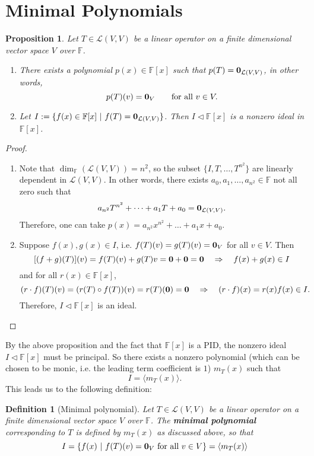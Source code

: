 \documentclass[12pt]{amsbook}
\newtheorem{definition}[theorem]{Definition}
\newtheorem{proposition}[theorem]{Proposition}
\begin{document}
\section{Minimal Polynomials}
\begin{proposition} \label{prop-minpoly}
    Let $T \in \mathcal{L}(V,V)$ be a linear operator on a finite dimensional vector space $V$ over $\mathbb{F}$. 
    \begin{enumerate}
    \item There exists a polynomial $p(x) \in \mathbb{F}[x]$ such that $p(T) = {\bf 0}_{\mathcal{L}(V,V)}$, in other words,
    $$p(T)(v) = {\bf 0}_V \quad \quad \text{for all}\ v \in V.$$
    \item Let $I := \{ f(x) \in \mathbb{F}[x]\ |\ f(T) = {\bf 0}_{\mathcal{L}(V,V)}\}$. Then $I \lhd \mathbb{F}[x]$ is a nonzero ideal in $\mathbb{F}[x]$.
    \end{enumerate}
\end{proposition}
\begin{proof}
    \begin{enumerate}
        \item Note that $\dim_{\mathbb{F}}(\mathcal{L}(V,V)) = n^2$, so the subset $\{I, T, \dots, T^{n^2}\}$ are linearly dependent in $\mathcal{L}(V,V)$. In other words, there exists $a_0, a_1, \dots, a_{n^2} \in \mathbb{F}$ not all zero such that
        $$a_{n^2} T^{n^2} + \dots + a_1 T + a_0 = {\bf 0}_{\mathcal{L}(V,V)}.$$
        Therefore, one can take $p(x) = a_{n^2} x^{n^2} + \dots + a_1 x + a_0$.
        \item Suppose $f(x), g(x) \in I$, i.e. $f(T)(v) = g(T)(v) = {\bf 0}_V$ for all $v \in V$. Then
        $$[(f+g)(T)](v) = f(T)(v) + g(T)v = {\bf 0} + {\bf 0} = {\bf 0}  \quad \Rightarrow \quad f(x) + g(x) \in I$$
        and for all $r(x) \in \mathbb{F}[x]$,
        $$(r \cdot f)(T)(v) = (r(T) \circ f(T))(v) = r(T)({\bf 0}) = {\bf 0} \quad \Rightarrow \quad (r\cdot f)(x) = r(x)f(x) \in I.$$
        Therefore, $I \lhd \mathbb{F}[x]$ is an ideal.
    \end{enumerate}
\end{proof}

By the above proposition and the fact that $\mathbb{F}[x]$ is a PID, the nonzero ideal $I \lhd \mathbb{F}[x]$ must be principal. So there exists a nonzero polynomial (which can be chosen to be monic, i.e. the leading term coefficient is $1$) $m_T(x)$ such that
$$I = \langle m_T(x) \rangle.$$
This leads us to the following definition:
\begin{definition}[Minimal polynomial]
    Let $T \in \mathcal{L}(V,V)$ be a linear operator on a finite dimensional vector space $V$ over $\mathbb{F}$. The {\bf minimal polynomial} corresponding to $T$ is defined by $m_T(x)$ as discussed above, so that
    $$I = \{f(x)\ |\ f(T)(v) = {\bf 0}_{V}\ \text{for all } v \in V\} = \langle m_T(x) \rangle$$
\end{definition}
\end{document}

